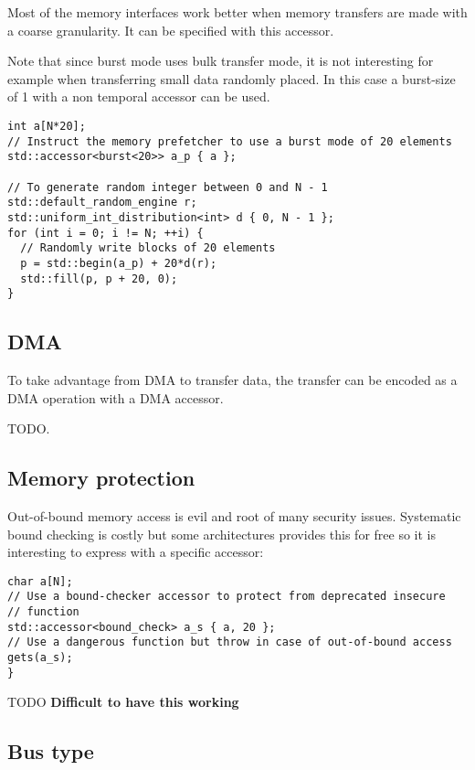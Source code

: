 \documentclass[a4paper]{article}
\begin{document}
Most of the memory interfaces work better when memory transfers are
made with a coarse granularity. It can be specified with this accessor.

Note that since burst mode uses bulk transfer mode, it is not
interesting for example when transferring small data randomly
placed. In this case a burst-size of 1 with a non temporal accessor
can be used.

\begin{lstlisting}
int a[N*20];
// Instruct the memory prefetcher to use a burst mode of 20 elements
std::accessor<burst<20>> a_p { a };

// To generate random integer between 0 and N - 1
std::default_random_engine r;
std::uniform_int_distribution<int> d { 0, N - 1 };
for (int i = 0; i != N; ++i) {
  // Randomly write blocks of 20 elements
  p = std::begin(a_p) + 20*d(r);
  std::fill(p, p + 20, 0);
}
\end{lstlisting}


\subsection{DMA}
\label{sec:dma}

To take advantage from DMA to transfer data, the transfer can be
encoded as a DMA operation with a DMA accessor.

TODO.


\subsection{Memory protection}
\label{sec:memory-protection}

Out-of-bound memory access is evil and root of many security
issues. Systematic bound checking is costly but some architectures
provides this for free so it is interesting to express with a specific
accessor:
\begin{lstlisting}
char a[N];
// Use a bound-checker accessor to protect from deprecated insecure
// function
std::accessor<bound_check> a_s { a, 20 };
// Use a dangerous function but throw in case of out-of-bound access
gets(a_s);
}
\end{lstlisting}

TODO \textbf{Difficult to have this working}


\subsection{Bus type}
\label{sec:bus-type}
\end{document}
